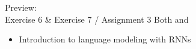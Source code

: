 %
%


\begin{frame}{Preview:\\ Exercise 6 \& Exercise 7 / Assignment 3}
	Both  and 
	\begin{itemize}
		\item Introduction to language modeling with RNNs
	\end{itemize}
\end{frame}

